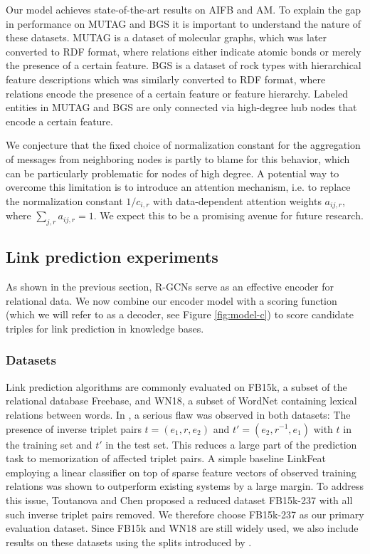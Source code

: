 Our model achieves state-of-the-art results on AIFB and AM. To explain the gap in performance on MUTAG and BGS it is important to understand the nature of these datasets. MUTAG is a dataset of molecular graphs, which was later converted to RDF format, where relations either indicate atomic bonds or merely the presence of a certain feature. BGS is a dataset of rock types with hierarchical feature descriptions which was similarly converted to RDF format, where relations encode the presence of a certain feature or feature hierarchy. Labeled entities in MUTAG and BGS are only connected via high-degree hub nodes that encode a certain feature.

We conjecture that the fixed choice of normalization constant for the aggregation of messages from neighboring nodes is partly to blame for this behavior, which can be particularly problematic for nodes of high degree. A potential way to overcome this limitation is to introduce an attention mechanism, i.e. to replace the normalization constant $1/c_{i,r}$ with data-dependent attention weights $a_{ij,r}$, where $\sum_{j,r}a_{ij,r}=1$. We expect this to be a promising avenue for future research.

\subsection{Link prediction experiments}
As shown in the previous section, R-GCNs serve as an effective encoder for relational data. We now combine our encoder model with a scoring function (which we will refer to as a decoder, see Figure \ref{fig:model-c}) to score candidate triples for link prediction in knowledge bases.

\subsubsection{Datasets}
Link prediction algorithms are commonly evaluated on FB15k, a subset of the relational database Freebase, and WN18, a subset of WordNet containing lexical relations between words. In \citet{toutanova2015observed}, a serious flaw was observed in both datasets: The presence of inverse triplet pairs $t = (e_1, r, e_2)$ and $t' = (e_2, r^{-1}, e_1)$ with $t$ in the training set and $t'$ in the test set. This reduces a large part of the prediction task to memorization of affected triplet pairs. A simple baseline LinkFeat employing a linear classifier on top of sparse feature vectors of observed training relations was shown to outperform existing systems by a large margin. To address this issue, Toutanova and Chen proposed a reduced dataset FB15k-237 with all such inverse triplet pairs removed. We therefore choose FB15k-237 as our primary evaluation dataset. Since FB15k and WN18 are still widely used, we also include results on these datasets using the splits introduced by \citet{bordes2013translating}.

